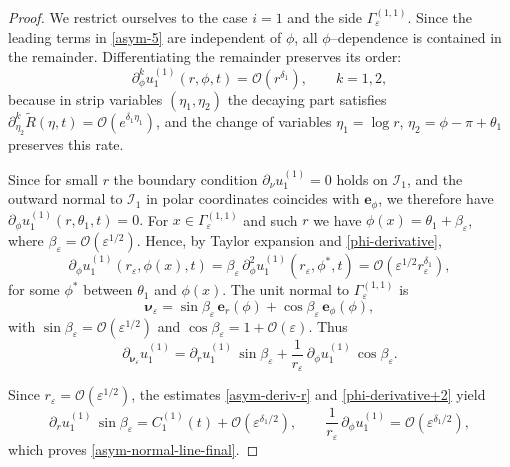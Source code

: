 \documentclass[10pt,a4paper]{amsart}
\begin{document}
	\begin{proof}
		We restrict ourselves to the case $i = 1$ and the side $\Gamma_\varepsilon^{(1,1)}.$ 
		Since the leading terms in \eqref{asym-5} are independent of $\phi$, all
		$\phi$–dependence is contained in the remainder. Differentiating the remainder
		preserves its order:
		\begin{equation}\label{phi-derivative}
			\partial_\phi^k u^{(1)}_1(r,\phi,t)
			= \mathcal{O}\!\left(r^{\delta_1}\right),
			\qquad k=1,2,
		\end{equation}
		because in strip variables $(\eta_1,\eta_2)$ the decaying part satisfies
		$\partial_{\eta_2}^k \widetilde{R}(\eta,t)=\mathcal{O}(e^{\delta_1\eta_1})$, and
		the change of variables $\eta_1=\log r$, $\eta_2=\phi-\pi+\theta_1$ preserves
		this rate.
		
		Since for small $r$ the boundary condition $\partial_\nu u^{(1)}_1=0$ holds on
		$\mathcal{I}_1$, and the outward normal to $\mathcal{I}_1$ in polar coordinates
		coincides with $\mathbf e_\phi$, we therefore have
		$
		\partial_\phi u^{(1)}_1(r,\theta_1,t)=0.
		$
		For $x\in \Gamma_\varepsilon^{(1,1)}$ and such $r$ we have $\phi(x)=\theta_1+\beta_\varepsilon$, where
		$\beta_\varepsilon=\mathcal{O}(\varepsilon^{1/2})$. Hence, by Taylor expansion and \eqref{phi-derivative},
		\begin{equation}\label{phi-derivative+2}
			\partial_\phi u^{(1)}_1(r_\varepsilon,\phi(x),t)
			= \beta_\varepsilon\,\partial^2_{\phi} u^{(1)}_1(r_\varepsilon,\phi^*,t)
			= \mathcal{O}\!\left(\varepsilon^{1/2} r_\varepsilon^{\delta_1}\right),
		\end{equation}
		for some $\phi^*$ between $\theta_1$ and $\phi(x)$. 
		The unit normal to $\Gamma_\varepsilon^{(1,1)}$ is
		\[
		\boldsymbol{\nu}_\varepsilon
		= \sin\beta_\varepsilon\,\mathbf e_r(\phi)
		+ \cos\beta_\varepsilon\,\mathbf e_\phi(\phi),
		\]
		with $\sin\beta_\varepsilon=\mathcal{O}(\varepsilon^{1/2})$ and
		$\cos\beta_\varepsilon=1+\mathcal{O}(\varepsilon)$.
		Thus
		\[
		\partial_{\boldsymbol{\nu}_\varepsilon} u^{(1)}_1
		= \partial_r u^{(1)}_1\,\sin\beta_\varepsilon
		+ \frac{1}{r_\varepsilon}\,\partial_\phi u^{(1)}_1\,\cos\beta_\varepsilon.
		\]
		
		Since $r_\varepsilon=\mathcal{O}(\varepsilon^{1/2})$, the estimates
		\eqref{asym-deriv-r} and \eqref{phi-derivative+2} yield
		\[
		\partial_r u^{(1)}_1\,\sin\beta_\varepsilon
		= C^{(1)}_1(t) + \mathcal{O}\!\left(\varepsilon^{\delta_1/2}\right),
		\qquad
		\frac{1}{r_\varepsilon}\,\partial_\phi u^{(1)}_1
		= \mathcal{O}\!\left(\varepsilon^{\delta_1/2}\right),
		\]
		which proves \eqref{asym-normal-line-final}.
	\end{proof}
\end{document}
